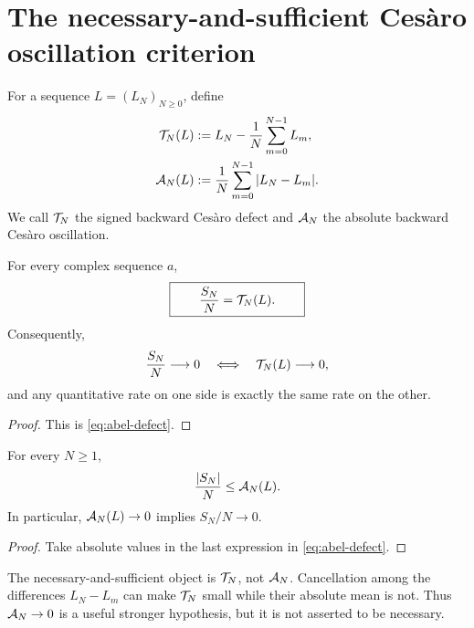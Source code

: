 \section{The necessary-and-sufficient Ces\`aro oscillation criterion}
\label{sec:cesaro-criterion}

\begin{definition}
\label{def:defect-oscillation}
For a sequence \(L=(L_N)_{N\ge0}\), define
\begin{align}
 \mathcal T_N(L)
 &:=L_N-\frac1N\sum_{m=0}^{N-1}L_m,
\label{eq:signed-defect}\\
 \mathcal A_N(L)
 &:=\frac1N\sum_{m=0}^{N-1}|L_N-L_m|.
\label{eq:absolute-oscillation}
\end{align}
We call \(\mathcal T_N\) the signed backward Ces\`aro defect and
\(\mathcal A_N\) the absolute backward Ces\`aro oscillation.
\end{definition}

\begin{theorem}
\label{thm:sharp-criterion}
For every complex sequence \(a\),
\begin{equation}
 \boxed{\qquad
 \frac{S_N}{N}=\mathcal T_N(L).
 \qquad}
\label{eq:sharp-criterion}
\end{equation}
Consequently,
\[
 \frac{S_N}{N}\longrightarrow0
 \quad\Longleftrightarrow\quad
 \mathcal T_N(L)\longrightarrow0,
\]
and any quantitative rate on one side is exactly the same rate on
the other.
\end{theorem}

\begin{proof}
This is \eqref{eq:abel-defect}.
\end{proof}

\begin{corollary}
\label{cor:absolute-sufficient}
For every \(N\ge1\),
\begin{equation}
 \frac{|S_N|}{N}\le\mathcal A_N(L).
\label{eq:absolute-dominates}
\end{equation}
In particular, \(\mathcal A_N(L)\to0\) implies \(S_N/N\to0\).
\end{corollary}

\begin{proof}
Take absolute values in the last expression in
\eqref{eq:abel-defect}.
\end{proof}

\begin{remark}
\label{rem:signed-essential}
The necessary-and-sufficient object is \(\mathcal T_N\), not \(\mathcal A_N\).
Cancellation among the differences \(L_N-L_m\) can make
\(\mathcal T_N\) small while their absolute mean is not.  Thus
\(\mathcal A_N\to0\) is a useful stronger hypothesis, but it is not asserted
to be necessary.
\end{remark}

